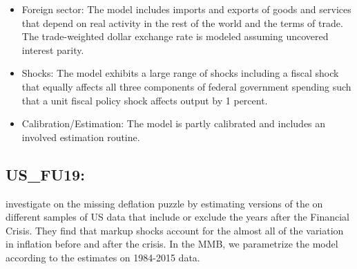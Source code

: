 \documentclass[11pt,a4paper]{article}
\begin{document}
\begin{itemize}
\item Foreign sector: The model includes imports and exports of goods and services that depend on real activity in the rest of the world and the terms of trade. The trade-weighted dollar exchange rate is modeled assuming uncovered interest parity.

\item Shocks: The model exhibits a large range of shocks including a fiscal shock that equally affects all three components of federal government spending such that a unit fiscal policy shock affects output by 1 percent.

\item Calibration/Estimation: The model is partly calibrated and includes an involved estimation routine.
\end{itemize}

	
	
	\subsection{US\_FU19: \texorpdfstring{\cite{fratto2019uhlig}}{Fratto and Uhlig} }
	\label{USFU19}
	
	\cite{fratto2019uhlig} investigate on the missing deflation puzzle by estimating versions of the \cite{SmetsWouters2007} on different samples of US data that include or exclude the years after the Financial Crisis. They find that markup shocks account for the almost all of the variation in inflation before and after the crisis. In the MMB, we parametrize the model according to the estimates on 1984-2015 data. 
	
\end{document}
